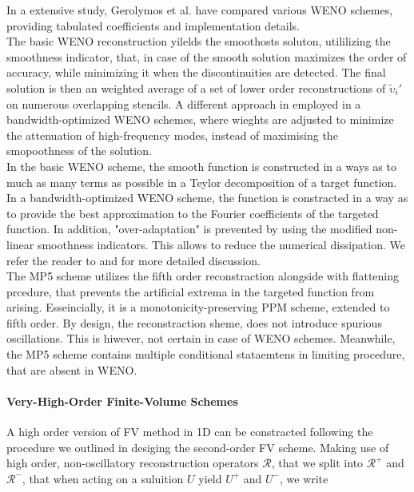 \documentclass[11pt,a4paper,headinclude=true,DIV=14,BCOR=8mm,chapterprefix,listof=totoc,twoside,openright,abstracton]{scrbook}
\begin{document}
In a extensive study, Gerolymos et al. \cite{Gerolymos:2009} have compared various WENO schemes, providing tabulated coefficients and implementation details.\\

The basic WENO reconstruction yilelds the smoothosts soluton, utililizing the smoothness indicator, that, in case of the smooth solution maximizes the order of accuracy, while minimizing it when the discontinuities are detected. The final solution is then an weighted average of a set of lower order reconstructions of $\widetilde{\upsilon}_i '$ on numerous overlapping stencils. A different approach in employed in a bandwidth-optimized WENO schemes, where wieghts are adjusted to minimize the attenuation of high-frequency modes, instead of maximising the smopoothness of the solution. \\
In the basic WENO scheme, the smooth function is constructed in a ways as to much as many terms as possible in a Teylor decomposition of a target function. In a bandwidth-optimized WENO scheme, the function is constracted in a way as to provide the best approximation to the Fourier coefficients of the targeted function. In addition, "over-adaptation" is prevented by using the modified non-linear smoothness indicators. This allows to reduce the numerical dissipation. We refer the reader to \cite{Martin:2006} and \cite{Taylor:2007} for more detailed discussion. \\

The MP5 scheme utilizes the fifth order reconstraction alongside with flattening prcedure, that prevents the artificial extrema in the targeted function from arising. Esseincially, it is a monotonicity-preserving PPM scheme, extended to fifth order. By design, the reconstraction sheme, does not introduce spurious oscillations. This is hiwever, not certain in case of WENO schemes. Meanwhile, the MP5 scheme contains multiple conditional stataemtens in limiting procedure, that are absent in WENO.

\paragraph{Very-High-Order Finite-Volume Schemes}

A high order version of FV method in 1D can be constracted following the procedure we outlined in desiging the second-order FV scheme. Making use of high order, non-oscillatory reconstruction operators $\mathcal{R}$, that we split into $\mathcal{R}^+$ and $\mathcal{R}^-$, that when acting on a suluition $U$ yield $U^+$ and $U^-$, we write 
\end{document}
